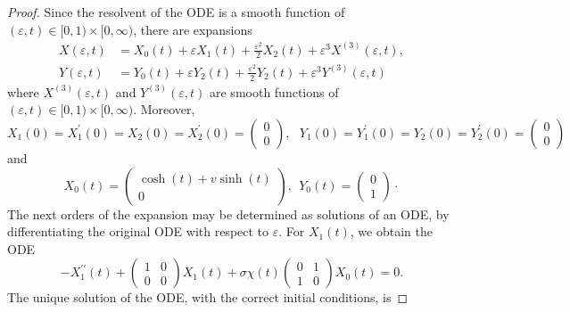 \documentclass[10pt,a4paper]{amsart}
\begin{document}
\begin{proof}
    Since the resolvent of the ODE is a smooth function of $(\varepsilon,t) \in [0,1) \times [0,\infty)$, there are expansions
    \begin{align*}
        X(\varepsilon,t) & = X_0(t) + \varepsilon X_1(t) + \frac{\varepsilon^2}{2} X_2(t) + \varepsilon^3X^{(3)}(\varepsilon,t) , \\
        Y(\varepsilon,t) & = Y_0(t) + \varepsilon Y_2(t) + \frac{\varepsilon^2}{2} Y_2(t) + \varepsilon^3Y^{(3)}(\varepsilon,t)
    \end{align*}
    where $X^{(3)}(\varepsilon,t)$ and $Y^{(3)}(\varepsilon,t)$ are smooth functions of $(\varepsilon,t) \in [0,1) \times [0,\infty)$. Moreover, 
    \begin{equation*}
        X_1(0) = X_1^\prime(0) = X_2(0) = X_2^\prime(0) = \begin{pmatrix}0 \\ 0\end{pmatrix}, ~~~ Y_1(0) = Y_1^\prime(0) = Y_2(0) = Y_2^\prime(0) = \begin{pmatrix}0 \\ 0\end{pmatrix}
    \end{equation*}
    and
    \begin{equation*}
        X_0(t) = \begin{pmatrix}
            \cosh(t) + v \sinh(t) \\
            0
        \end{pmatrix}, 
        ~~
        Y_0(t) = \begin{pmatrix}
            0 \\ 1
        \end{pmatrix} \cdot
    \end{equation*}
    The next orders of the expansion may be determined as solutions of an ODE, by differentiating the original ODE with respect to $\varepsilon$. For $X_1(t)$, we obtain the ODE
    \begin{equation*}
        - X_1^{\prime\prime}(t) + \begin{pmatrix} 1 & 0 \\ 0 & 0\end{pmatrix}X_1(t) + \sigma \chi(t) \begin{pmatrix} 0 & 1 \\ 1 & 0\end{pmatrix} X_0(t) = 0 .
    \end{equation*}
    The unique solution of the ODE, with the correct initial conditions, is

\end{proof}
\end{document}
